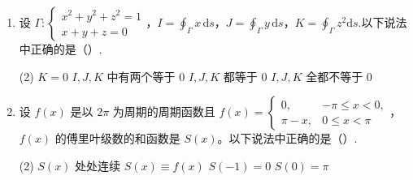\documentclass[../Main.tex]{subfiles}
\begin{document}
\begin{enumerate}
          \begin{tasks}[label=\textbf{\Alph*.}, label-width=1.5em, column-sep=1em](1)
              \task \( \displaystyle \int_0^2 \mathrm{d}x \displaystyle \int_0^{1 + \sqrt{1 - x^2}} f(x, y) \mathrm{d}y \)
              \task \( \displaystyle \int_0^2 \mathrm{d}x \displaystyle \int_0^{\sqrt{2x - x^2}} f(x, y) \mathrm{d}y \)
              \task \( \displaystyle \int_0^2 \mathrm{d}y \displaystyle \int_0^{\sqrt{2y - y^2}} f(x, y) \mathrm{d}x \)
              \task \( \displaystyle \int_0^2 \mathrm{d}x \displaystyle \int_0^2 f(x, y) \mathrm{d}y \)
          \end{tasks}

    \item 设 \( \Gamma: \begin{cases} x^2 + y^2 + z^2 = 1 \\ x + y + z = 0 \end{cases} \)，\( I = \displaystyle \oint_{\Gamma} x\,\mathrm{d}s \)，\( J = \displaystyle \oint_{\Gamma} y\,\mathrm{d}s \)，\( K = \displaystyle \oint_{\Gamma} z^2 \mathrm{d}s \).以下说法中正确的是（\qquad）.

          \begin{tasks}[label=\textbf{\Alph*.}, label-width=1.5em, column-sep=1em](2)
              \task \( K = 0 \)
              \task \( I, J, K \) 中有两个等于 0
              \task \( I, J, K \) 都等于 0
              \task \( I, J, K \) 全都不等于 0
          \end{tasks}

    \item 设 \( f(x) \) 是以 \( 2\pi \) 为周期的周期函数且 \( f(x) = \begin{cases} 0, & -\pi \leq x < 0, \\ \pi - x, & 0 \leq x < \pi \end{cases} \)，\( f(x) \) 的傅里叶级数的和函数是 \( S(x) \)。以下说法中正确的是（\qquad）.

          \begin{tasks}[label=\textbf{\Alph*.}, label-width=1.5em, column-sep=1em](2)
              \task \( S(x) \) 处处连续
              \task \( S(x) \equiv f(x) \)
              \task \( S(-1) = 0 \)
              \task \( S(0) = \pi \)
          \end{tasks}
\end{enumerate}
\end{document}
